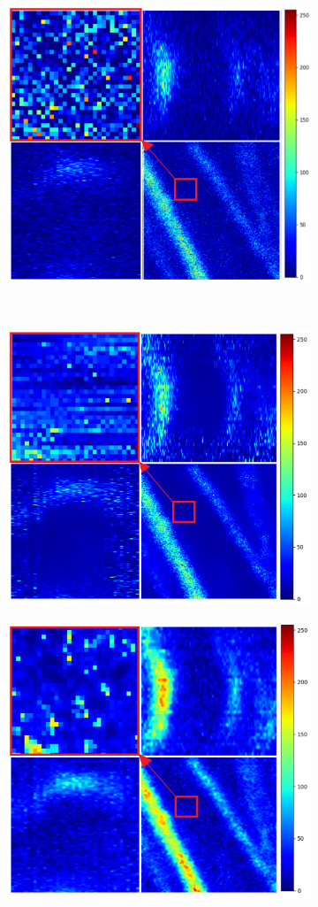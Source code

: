 \begin{figure}[H]
	\begin{center}
		\begin{subfigure}[t]{\dimexpr.5\linewidth-0.7em\relax}
			\centering
			\includegraphics[width=.55\linewidth,valign=t]{my_folder/images/denoising/noisy_part_color.png}
		\end{subfigure}
	\end{center}
	\hfill %
	\\[20pt]
	\begin{subfigure}[t]{\dimexpr.5\linewidth-0.7em\relax}
		\centering
		\includegraphics[width=.55\linewidth,valign=t]{my_folder/images/denoising/nlm_part_color.png}
	\end{subfigure}
	\hfill %
	\begin{subfigure}[t]{\dimexpr.5\linewidth-0.7em\relax}
		\centering
		\includegraphics[width=.55\linewidth,valign=t]{my_folder/images/denoising/n2n_part_color.png}

\end{subfigure}
\end{figure}
